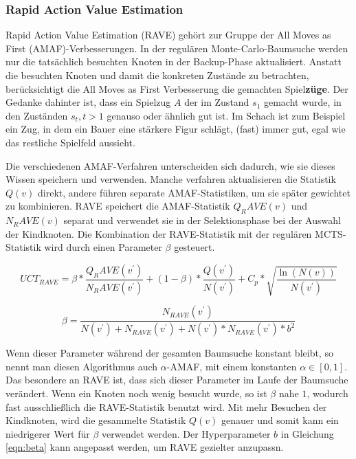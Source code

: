 \subsubsection{Rapid Action Value Estimation}

Rapid Action Value Estimation (RAVE) gehört zur Gruppe der All Moves as First (AMAF)-Verbesserungen.
In der regulären Monte-Carlo-Baumsuche werden nur die tatsächlich besuchten Knoten in der Backup-Phase aktualisiert.
Anstatt die besuchten Knoten und damit die konkreten Zustände zu betrachten, berücksichtigt die All Moves as First Verbesserung die gemachten Spiel\textbf{züge}. Der Gedanke dahinter ist, dass ein Spielzug $A$ der im Zustand $s_1$ gemacht wurde, in den Zuständen $s_t, t > 1$ genauso oder ähnlich gut ist. Im Schach ist zum Beispiel ein Zug, in dem ein Bauer eine stärkere Figur schlägt, (fast) immer gut, egal wie das restliche Spielfeld aussieht.

Die verschiedenen AMAF-Verfahren unterscheiden sich dadurch, wie sie dieses Wissen speichern und verwenden. Manche verfahren aktualisieren die Statistik $Q(v)$ direkt, andere führen separate AMAF-Statistiken, um sie später gewichtet zu kombinieren. RAVE speichert die AMAF-Statistik $Q_RAVE(v)$ und $N_RAVE(v)$ separat und verwendet sie in der Selektionsphase bei der Auswahl der Kindknoten. Die Kombination der RAVE-Statistik mit der regulären MCTS-Statistik wird durch einen Parameter $\beta$ gesteuert.

\begin{equation}
UCT_{RAVE}=\beta * \frac{Q_RAVE(v^\prime)}{N_RAVE(v^\prime)} + (1-\beta) * \frac{Q(v^\prime)}{N(v^\prime)} + C_p * \sqrt{\frac{\ln(N(v))}{N(v^\prime)}}
\label{eqn:uct-rave}
\end{equation}

\begin{equation}
\beta = \frac{N_{RAVE}(v^\prime)}{N(v^\prime)+N_{RAVE}(v^\prime)+N(v^\prime)*N_{RAVE}(v^\prime)*b^2}
\label{eqn:beta}
\end{equation}


Wenn dieser Parameter während der gesamten Baumsuche konstant bleibt, so nennt man diesen Algorithmus auch $\alpha$-AMAF, mit einem konstanten $\alpha \in [0,1]$. Das besondere an RAVE ist, dass sich dieser Parameter im Laufe der Baumsuche verändert. Wenn ein Knoten noch wenig besucht wurde, so ist $\beta$ nahe $1$, wodurch fast ausschließlich die RAVE-Statistik benutzt wird. Mit mehr Besuchen der Kindknoten, wird die gesammelte Statistik $Q(v)$ genauer und somit kann ein niedrigerer Wert für $\beta$ verwendet werden. Der Hyperparameter $b$ in Gleichung \ref{eqn:beta} kann angepasst werden, um RAVE gezielter anzupassn.

